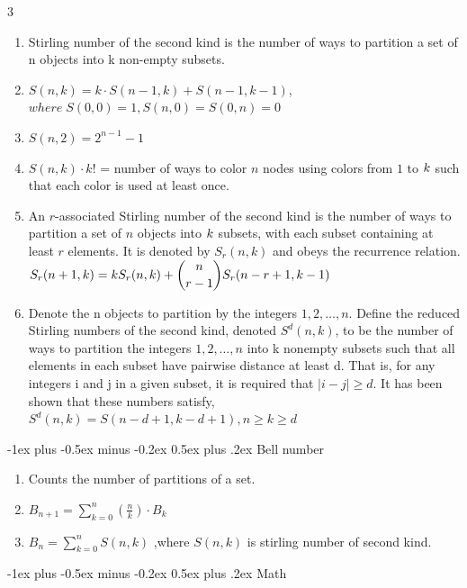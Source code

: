 \documentclass[8pt,a4paper,onesided]{article}
\makeatletter
\renewcommand{\subsection}{\@startsection{subsection}{2}{0mm}
    {-1ex plus -0.5ex minus -0.2ex} %
    {0.5ex plus .2ex}                %
    {\normalfont\large\bfseries}}    %
\makeatother
\begin{document}
\begin{multicols}{3}
\begin{enumerate}[resume]
    \item Stirling number of the second kind is the number of ways to partition a set of n objects into k non-empty subsets.
    \item $S(n,k)=k \cdot S(n-1,k)+S(n-1,k-1)$,
    \(where \; S(0,0)=1,S(n,0)=S(0,n)=0\)
    \item $S(n,2)=2^{n-1}-1$
    \item $S(n,k) \cdot k!$ = number of ways to color $n$ nodes using colors from $\displaystyle 1$ to $\displaystyle \displaystyle k$ such that each color is used at least once.
    \item An $r$-associated Stirling number of the second kind is the number of ways to partition a set of $n$ objects into $\displaystyle \displaystyle k$ subsets, with each subset containing at least $r$ elements. It is denoted by $S_r( n , k )$ and obeys the recurrence relation.
    $\displaystyle \displaystyle S_r(n+1,k) = k S_r(n,k) + \binom{n}{r-1} S_r(n-r+1,k-1)$
    \item Denote the n objects to partition by the integers $\displaystyle 1, 2, \dots, n$. Define the reduced Stirling numbers of the second kind, denoted $S^d(n, k)$, to be the number of ways to partition the integers $\displaystyle 1, 2, \dots, n$ into k nonempty subsets such that all elements in each subset have pairwise distance at least d.
    That is, for any integers i and j in a given subset, it is required that $|i - j| \geq d$. It has been shown that these numbers satisfy,
    \(S^d(n, k) = S(n - d + 1, k - d + 1), n \geq k \geq d\)
\end{enumerate}

\subsection{Bell number}

\begin{enumerate}[resume]
    \item Counts the number of partitions of a set.
    \item $B_{n+1}=\displaystyle\sum_{k=0}^{n}\left(\frac{n}{k}\right) \cdot B_{k}$
    \item $B_{n}=\displaystyle\sum_{k=0}^{n}S(n,k)$ ,where $S(n,k)$ is stirling number of second kind.
\end{enumerate}

\subsection{Math}


\end{multicols}
\end{document}
